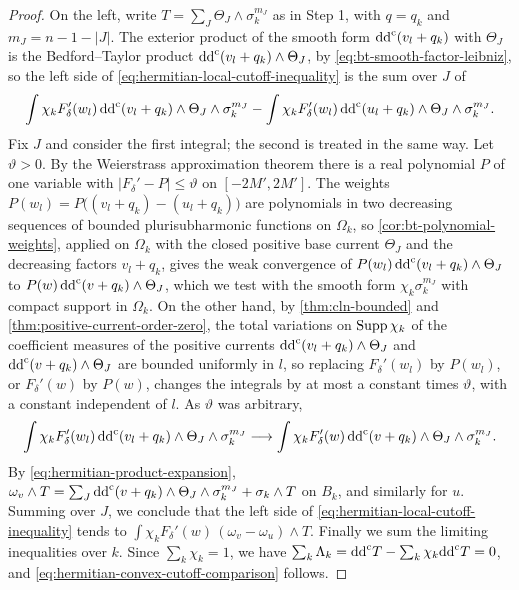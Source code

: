 \begin{proof}
On the left, write $T=\sum_J\Theta_J\wedge\sigma_k^{m_J}$ as in Step 1, with $q=q_k$ and $m_J=n-1-|J|$. The exterior product of the smooth form $\mathrm{dd}^{\mathrm{c}}(v_l+q_k)$ with $\Theta_J$ is the Bedford--Taylor product $\mathrm{dd}^{\mathrm{c}}(v_l+q_k)\wedge\Theta_J$, by \eqref{eq:bt-smooth-factor-leibniz}, so the left side of \eqref{eq:hermitian-local-cutoff-inequality} is the sum over $J$ of
\[
 \int\chi_kF_\delta'(w_l)\,\mathrm{dd}^{\mathrm{c}}(v_l+q_k)\wedge\Theta_J\wedge\sigma_k^{m_J}-\int\chi_kF_\delta'(w_l)\,\mathrm{dd}^{\mathrm{c}}(u_l+q_k)\wedge\Theta_J\wedge\sigma_k^{m_J}.
\]
Fix $J$ and consider the first integral; the second is treated in the same way. Let $\vartheta>0$. By the Weierstrass approximation theorem there is a real polynomial $P$ of one variable with $|F_\delta'-P|\leq\vartheta$ on $[-2M',2M']$. The weights $P(w_l)=P\bigl((v_l+q_k)-(u_l+q_k)\bigr)$ are polynomials in two decreasing sequences of bounded plurisubharmonic functions on $\Omega_k$, so \cref{cor:bt-polynomial-weights}, applied on $\Omega_k$ with the closed positive base current $\Theta_J$ and the decreasing factors $v_l+q_k$, gives the weak convergence of $P(w_l)\,\mathrm{dd}^{\mathrm{c}}(v_l+q_k)\wedge\Theta_J$ to $P(w)\,\mathrm{dd}^{\mathrm{c}}(v+q_k)\wedge\Theta_J$, which we test with the smooth form $\chi_k\sigma_k^{m_J}$ with compact support in $\Omega_k$. On the other hand, by \cref{thm:cln-bounded} and \cref{thm:positive-current-order-zero}, the total variations on $\operatorname{Supp}\chi_k$ of the coefficient measures of the positive currents $\mathrm{dd}^{\mathrm{c}}(v_l+q_k)\wedge\Theta_J$ and $\mathrm{dd}^{\mathrm{c}}(v+q_k)\wedge\Theta_J$ are bounded uniformly in $l$, so replacing $F_\delta'(w_l)$ by $P(w_l)$, or $F_\delta'(w)$ by $P(w)$, changes the integrals by at most a constant times $\vartheta$, with a constant independent of $l$. As $\vartheta$ was arbitrary,
\[
 \int\chi_kF_\delta'(w_l)\,\mathrm{dd}^{\mathrm{c}}(v_l+q_k)\wedge\Theta_J\wedge\sigma_k^{m_J}\longrightarrow\int\chi_kF_\delta'(w)\,\mathrm{dd}^{\mathrm{c}}(v+q_k)\wedge\Theta_J\wedge\sigma_k^{m_J}.
\]
By \eqref{eq:hermitian-product-expansion}, $\omega_v\wedge T=\sum_J\mathrm{dd}^{\mathrm{c}}(v+q_k)\wedge\Theta_J\wedge\sigma_k^{m_J}+\sigma_k\wedge T$ on $B_k$, and similarly for $u$. Summing over $J$, we conclude that the left side of \eqref{eq:hermitian-local-cutoff-inequality} tends to $\int\chi_kF_\delta'(w)\,(\omega_v-\omega_u)\wedge T$. Finally we sum the limiting inequalities over $k$. Since $\sum_k\chi_k=1$, we have $\sum_k\Lambda_k=\mathrm{dd}^{\mathrm{c}} T-\sum_k\chi_k\mathrm{dd}^{\mathrm{c}} T=0$, and \eqref{eq:hermitian-convex-cutoff-comparison} follows.
\end{proof}

